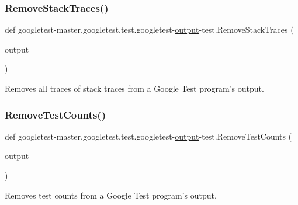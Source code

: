 \subsubsection{\texorpdfstring{RemoveStackTraces()}{RemoveStackTraces()}}
{\footnotesize\ttfamily def googletest-\/master.\+googletest.\+test.\+googletest-\/\mbox{\hyperlink{namespacegoogletest-master_1_1googletest_1_1test_1_1googletest-output-test_a734f0a5bd94ba038f4350763c6977129}{output}}-\/test.\+Remove\+Stack\+Traces (\begin{DoxyParamCaption}\item[{}]{output }\end{DoxyParamCaption})}

\begin{DoxyVerb}Removes all traces of stack traces from a Google Test program's output.\end{DoxyVerb}
 \mbox{\label{namespacegoogletest-master_1_1googletest_1_1test_1_1googletest-output-test_a1ed6e9dc7176e5072f1be1ed780431a5}} 
\subsubsection{\texorpdfstring{RemoveTestCounts()}{RemoveTestCounts()}}
{\footnotesize\ttfamily def googletest-\/master.\+googletest.\+test.\+googletest-\/\mbox{\hyperlink{namespacegoogletest-master_1_1googletest_1_1test_1_1googletest-output-test_a734f0a5bd94ba038f4350763c6977129}{output}}-\/test.\+Remove\+Test\+Counts (\begin{DoxyParamCaption}\item[{}]{output }\end{DoxyParamCaption})}

\begin{DoxyVerb}Removes test counts from a Google Test program's output.\end{DoxyVerb}
 \mbox{\label{namespacegoogletest-master_1_1googletest_1_1test_1_1googletest-output-test_a75890b23e25ee3a8771b216c33346e8b}} 

